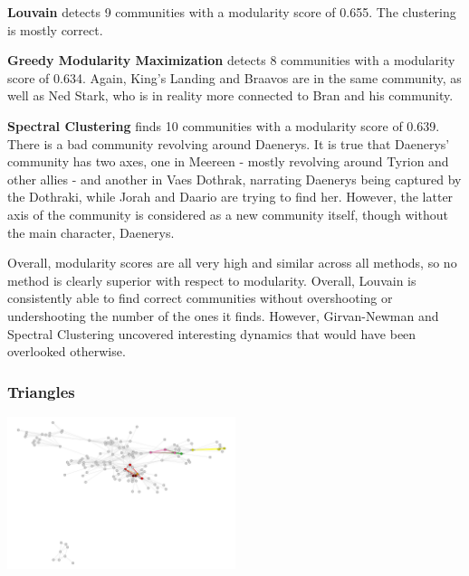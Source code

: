 \documentclass[10pt,twocolumn,letterpaper]{article}
\begin{document}
\textbf{Louvain} detects 9 communities with a modularity score of 0.655. The clustering is mostly correct.

\textbf{Greedy Modularity Maximization} detects 8 communities with a modularity score of 0.634. Again, King's Landing and Braavos are in the same community, as well as Ned Stark, who is in reality more connected to Bran and his community.

\textbf{Spectral Clustering} finds 10 communities with a modularity score of 0.639. There is a bad community revolving around Daenerys. It is true that Daenerys' community has two axes, one in Meereen - mostly revolving around Tyrion and other allies - and another in Vaes Dothrak, narrating Daenerys being captured by the Dothraki, while Jorah and Daario are trying to find her. However, the latter axis of the community is considered as a new community itself, though without the main character, Daenerys.

Overall, modularity scores are all very high and similar across all methods, so no method is clearly superior with respect to modularity. Overall, Louvain is consistently able to find correct communities without overshooting or undershooting the number of the ones it finds. However, Girvan-Newman and Spectral Clustering uncovered interesting dynamics that would have been overlooked otherwise.


\subsubsection{Triangles}

\begin{center}
    \includegraphics[width=0.5\textwidth]{img/s6/s6_triangles.jpg}
\end{center}
\end{document}
